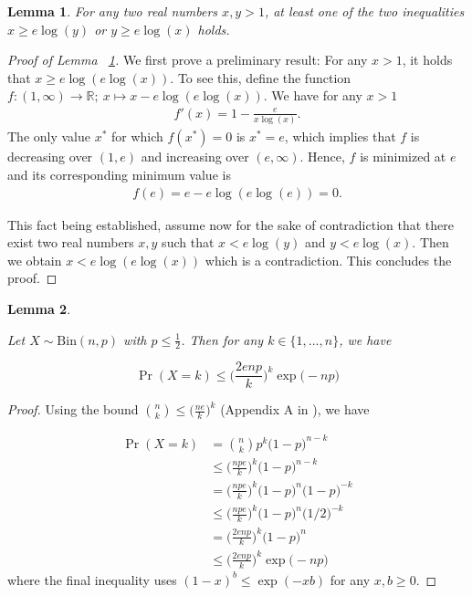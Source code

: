 \documentclass{article}
\newcommand{\R}{\mathbb{R}}
\newtheorem{lemma}{Lemma}
\theoremstyle{remark}
\begin{document}
\begin{lemma}\label{lem_2.6}
    For any two real numbers $x,y>1$, at least one of the two inequalities $x \geq e \log(y)$ or $y \geq e\log(x)$ holds.
\end{lemma}
\begin{proof}[Proof of Lemma ~\ref{lem_2.6}]
    We first prove a preliminary result: For any $x > 1$, it holds that $x \geq e\log(e \log(x))$. 
    To see this, define the function $f: (1,\infty) \to \R;~ x \mapsto x - e\log(e \log(x))$. We have for any $x>1$
    \begin{align*}
        f'(x) = 1 - \frac{e}{x\log(x)}.
    \end{align*}
    The only value $x^*$ for which $f(x^*)=0$ is $x^* = e$, which implies that $f$ is decreasing over $(1,e)$ and increasing over $(e,\infty)$. Hence, $f$ is minimized at $e$ and its corresponding minimum value is
    \begin{align*}
        f(e) = e - e\log(e\log(e)) = 0.
    \end{align*}

    This fact being established, assume now for the sake of contradiction that there exist two real numbers $x,y$ such that $x<e \log(y)$ and $y< e\log(x)$. 
    Then we obtain $x< e\log(e\log(x))$ which is a contradiction. This concludes the proof.
\end{proof}

\begin{lemma}\label{lemma:probXk}

Let $X \sim \text{Bin}(n, p)$ with $p \leq \frac12$. Then for any $k \in \{1, ..., n\}$, we have 

\[\Pr(X = k) \leq \Big(\frac{2enp}{k}\Big)^k\exp\big(-np\big)\]
    
\end{lemma}

\begin{proof}
    Using the bound ${n \choose k } \leq \big(\frac{ne}{k}\big)^k$ (Appendix A in \cite{roch2024modern}), we have 

    \begin{align*}
        \Pr(X = k) &= {n \choose k}p^k\big(1 - p\big)^{n - k} \\
        &\leq \Big(\frac{npe}{k}\Big)^k\big(1 - p\big)^{n - k} \\
        &=  \Big(\frac{npe}{k}\Big)^k\big(1 - p\big)^{n}\big(1 - p\big)^{-k} \\ 
        &\leq \Big(\frac{npe}{k}\Big)^k\big(1 - p\big)^{n}\big(1/2\big)^{-k} \\
        &= \Big(\frac{2enp}{k}\Big)^k\Big(1 - p\Big)^{n} \\
        &\leq \Big(\frac{2enp}{k}\Big)^k\exp\big(-np\big)
    \end{align*}
where the final inequality uses $(1 - x)^b \leq \exp(-xb)$ for any $x, b \geq 0$.
\end{proof}
\end{document}
